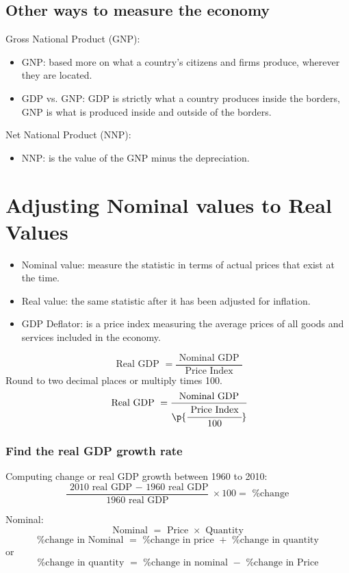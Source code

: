 \documentclass{article}
\begin{document}
\subsection{Other ways to measure the economy}
Gross National Product (GNP): 
\begin{itemize}
    \item GNP: based more on what a country's citizens and firms produce, wherever they are located.
    \item GDP vs. GNP: GDP is strictly what a country produces inside the borders, GNP is what is produced inside and outside of the borders.  
\end{itemize}
Net National Product (NNP): 
\begin{itemize}
    \item NNP: is the value of the GNP minus the depreciation. 
\end{itemize}


\section{Adjusting Nominal values to Real Values}
\begin{itemize}
    \item Nominal value: measure the statistic in terms of actual prices that exist at the time.
    \item Real value: the same statistic after it has been adjusted for inflation. 
    \item GDP Deflator:  is a price index measuring the average prices of all goods and services included in the economy. 
\end{itemize}
\[
  \text{ Real GDP } = \frac{\text{ Nominal GDP }}{\text{ Price Index }} 
\]
Round to two decimal places or multiply times 100.
\[
  \text{ Real GDP } = \frac{\text{ Nominal GDP }}{\p{\cfrac{\text{ Price Index }}{100}}} 
\]

\subsubsection{Find the real GDP growth rate}
Computing change or real GDP growth between 1960 to 2010:  
\[
  \frac{\text{ 2010 real GDP } - \text{ 1960 real GDP}}{\text{ 1960 real GDP }} \times 100 = \text{ \% change } 
\]

Nominal: 
\[
  \text{ Nominal } = \text{ Price } \times \text{ Quantity } 
\]
\[
  \text{ \% change in Nominal } = \text{ \% change in price } + \text{ \% change in quantity }
\]
or 
\[
  \text{ \% change in quantity } = \text{ \% change in nominal } - \text{ \% change in Price }
\]
\end{document}
